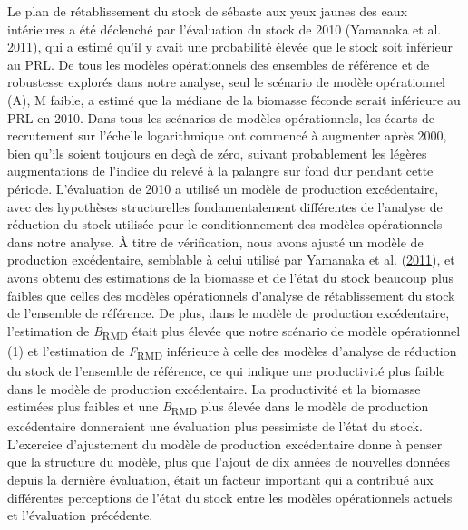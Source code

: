\documentclass[11pt]{book}
\begin{document}
Le plan de rétablissement du stock de sébaste aux yeux jaunes des eaux intérieures a été déclenché par l'évaluation du stock de 2010 (Yamanaka et al. \protect\hyperlink{ref-yamanaka2011}{2011}), qui a estimé qu'il y avait une probabilité élevée que le stock soit inférieur au PRL. De tous les modèles opérationnels des ensembles de référence et de robustesse explorés dans notre analyse, seul le scénario de modèle opérationnel (A), M faible, a estimé que la médiane de la biomasse féconde serait inférieure au PRL en 2010. Dans tous les scénarios de modèles opérationnels, les écarts de recrutement sur l'échelle logarithmique ont commencé à augmenter après 2000, bien qu'ils soient toujours en deçà de zéro, suivant probablement les légères augmentations de l'indice du relevé à la palangre sur fond dur pendant cette période. L'évaluation de 2010 a utilisé un modèle de production excédentaire, avec des hypothèses structurelles fondamentalement différentes de l'analyse de réduction du stock utilisée pour le conditionnement des modèles opérationnels dans notre analyse. À titre de vérification, nous avons ajusté un modèle de production excédentaire, semblable à celui utilisé par Yamanaka et al. (\protect\hyperlink{ref-yamanaka2011}{2011}), et avons obtenu des estimations de la biomasse et de l'état du stock beaucoup plus faibles que celles des modèles opérationnels d'analyse de rétablissement du stock de l'ensemble de référence. De plus, dans le modèle de production excédentaire, l'estimation de \emph{B}\textsubscript{RMD} était plus élevée que notre scénario de modèle opérationnel (1) et l'estimation de \emph{F}\textsubscript{RMD} inférieure à celle des modèles d'analyse de réduction du stock de l'ensemble de référence, ce qui indique une productivité plus faible dans le modèle de production excédentaire. La productivité et la biomasse estimées plus faibles et une \emph{B}\textsubscript{RMD} plus élevée dans le modèle de production excédentaire donneraient une évaluation plus pessimiste de l'état du stock. L'exercice d'ajustement du modèle de production excédentaire donne à penser que la structure du modèle, plus que l'ajout de dix années de nouvelles données depuis la dernière évaluation, était un facteur important qui a contribué aux différentes perceptions de l'état du stock entre les modèles opérationnels actuels et l'évaluation précédente.
\end{document}
